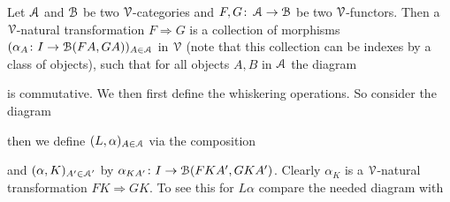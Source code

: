 \documentclass[a4paper,11pt,oneside,openany]{scrbook}
\begin{document}
\begin{defn}
   Let $\operatorname{\mathcal{A}}$ and $\operatorname{\mathcal{B}}$ be two $\operatorname{\mathcal{V}}$-categories and $F,G \colon \operatorname{\mathcal{A}} \to \operatorname{\mathcal{B}}$ be two $\operatorname{\mathcal{V}}$-functors. Then a $\operatorname{\mathcal{V}}$-natural transformation $F \Rightarrow G$ is a 
   collection of morphisms $(\alpha_{A} \colon I \to \operatorname{\mathcal{B}}(FA,GA))_{A \in \operatorname{\mathcal{A}}}$ in $\operatorname{\mathcal{V}}$ (note that this collection can be indexes by a class of objects), such that for 
   all objects $A,B$ in $\operatorname{\mathcal{A}}$ the diagram 
      \begin{center}
      \end{center}
   is commutative. We then first define the whiskering operations. So consider the diagram 
      \begin{center}
      \end{center}
   then we define $(L, \alpha)_{A\in \operatorname{\mathcal{A}}}$ via the composition 
      \begin{center}
      \end{center}
   and $(\alpha, K)_{A' \in \operatorname{\mathcal{A}}'}$ by $\alpha_{KA'} \colon I \to \operatorname{\mathcal{B}}(FKA',GKA')$. Clearly $\alpha_{K}$ is a $\operatorname{\mathcal{V}}$-natural transformation $FK \Rightarrow GK$. To see 
   this for $L\alpha$ compare the needed diagram with 
      \begin{center}
\end{center}
\end{defn}
\end{document}
